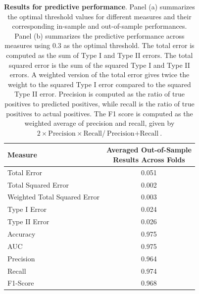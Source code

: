 \documentclass[a4paper,12pt]{article}
\begin{document}
\begin{table}[!htb]
\begin{threeparttable}
\begin{subtable}[t]{0.7\textwidth}
\centering
\caption{Out-of-sample performance at threshold 0.3}
\label{out-of-sample-results}
\begin{tabular}{lc}
\hline
Measure  & \makecell{Averaged Out-of-Sample \\ Results Across Folds} \\
\midrule
Total Error                    & 0.051 \\
Total Squared Error           & 0.002 \\
Weighted Total Squared Error  & 0.003 \\
Type I Error                  & 0.024 \\
Type II Error                 & 0.026 \\
Accuracy                      & 0.975 \\
AUC                           & 0.975 \\
Precision                     & 0.964 \\
Recall                        & 0.974 \\
F1-Score                      & 0.968 \\
\hline
\end{tabular}
\end{subtable}
\caption{\textbf{Results for predictive performance}. Panel (a) summarizes the optimal threshold values for different measures and their corresponding
in-sample and out-of-sample performances. Panel (b) summarizes the predictive performance across measures using 0.3 as the optimal threshold. 
The total error is computed as the sum of Type I and Type II errors. The total squared error is the sum of the squared Type I and Type II errors. A weighted version of the total error gives twice the weight to the squared Type I error compared to the squared Type II error. Precision is computed as the ratio of true positives to predicted positives, while recall is the ratio of true positives to actual positives. The F1 score is computed as the weighted average of precision and recall, given by $2 \times \text{Precision} \times \text{Recall}$/$\text{Precision}+\text{Recall}$.}
\label{predictive-performance-results}
\end{threeparttable}
\end{table}
\end{document}
